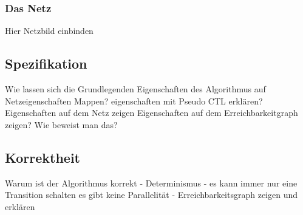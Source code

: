 \subsubsection{Das Netz}
Hier Netzbild einbinden

\subsection{Spezifikation}
Wie lassen sich die Grundlegenden Eigenschaften des Algorithmus auf Netzeigenschaften Mappen?
eigenschaften mit Pseudo CTL erklären?
Eigenschaften auf dem Netz zeigen
Eigenschaften auf dem Erreichbarkeitgraph zeigen?
Wie beweist man das?


\subsection{Korrektheit}
Warum ist der Algorithmus korrekt
- Determinismus
- es kann immer nur eine Transition schalten es gibt keine Parallelität
- Erreichbarkeitsgraph zeigen und erklären
